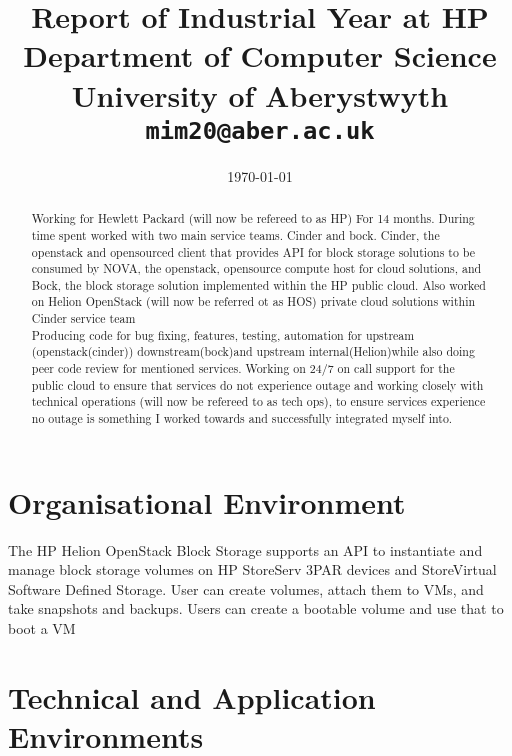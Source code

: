 \documentclass[11pt,a4paper]{report}
\begin{document}
\title{Report of Industrial Year at HP\\Department of Computer Science\\ University of Aberystwyth\\ \texttt{mim20@aber.ac.uk}} \date{\today}
\maketitle

\begin{abstract} 

Working for Hewlett Packard (will now be refereed to as HP) For 14 months. During time spent worked with two main service teams. Cinder and bock. Cinder, the openstack and opensourced client that provides API for block storage solutions to be consumed by NOVA, the openstack, opensource compute host for cloud solutions, and Bock, the block storage solution implemented within the HP public cloud. Also worked on Helion OpenStack (will now be referred ot as HOS) private cloud solutions within Cinder service team\\ 
Producing code for bug fixing, features, testing, automation for upstream (openstack(cinder)) downstream(bock)and upstream internal(Helion)while also doing peer code review for mentioned services. 
Working on 24/7 on call support for the public cloud to ensure that services do not experience outage and working closely with technical operations (will now be refereed to as tech ops), to ensure services experience no outage is something I worked towards and successfully integrated myself into.

\end{abstract}

\tableofcontents
\newpage
\section{Organisational Environment}



The HP Helion OpenStack Block Storage supports an API to instantiate and manage block storage volumes on HP StoreServ 3PAR devices and StoreVirtual Software Defined Storage. User can create volumes, attach them to VMs, and take snapshots and backups. Users can create a bootable volume and use that to boot a VM
 


\section{Technical and Application Environments}
\end{document}
